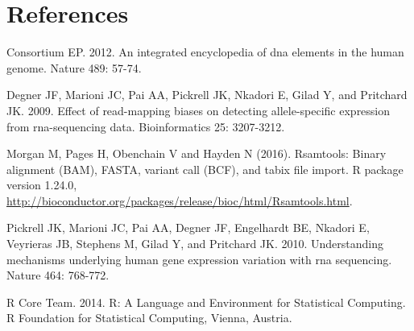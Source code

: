 \documentclass{article}\usepackage[]{graphicx}\usepackage[usenames,dvipsnames]{color}
\begin{document}
\section*{References}

Consortium EP. 2012. An integrated encyclopedia of dna elements in the human genome. Nature 489: 57-74.

Degner JF, Marioni JC, Pai AA, Pickrell JK, Nkadori E, Gilad Y, and Pritchard JK. 2009. Effect of read-mapping biases on detecting allele-specific expression from rna-sequencing data. Bioinformatics 25: 3207-3212.

Morgan M, Pages H, Obenchain V and Hayden N (2016). Rsamtools: Binary alignment (BAM), FASTA, variant call (BCF), and tabix file import. R package version 1.24.0, \href{http://bioconductor.org/packages/release/bioc/html/Rsamtools.html}{http://bioconductor.org/packages/release/bioc/html/Rsamtools.html}. 

Pickrell JK, Marioni JC, Pai AA, Degner JF, Engelhardt BE, Nkadori E, Veyrieras JB, Stephens M, Gilad Y, and Pritchard JK. 2010. Understanding mechanisms underlying human gene expression variation with rna sequencing. Nature 464: 768-772.

R Core Team. 2014. R: A Language and Environment for Statistical Computing. R Foundation for Statistical Computing, Vienna, Austria.
\end{document}
